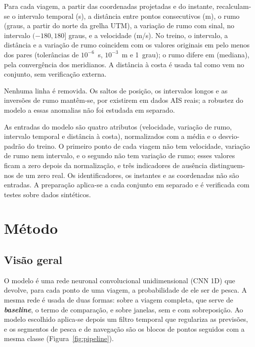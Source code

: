 \documentclass{article}
\begin{document}
Para cada viagem, a partir das coordenadas projetadas e do instante, recalculam-se o intervalo temporal (s), a distância entre pontos consecutivos (m), o rumo (graus, a partir do norte da grelha UTM), a variação de rumo com sinal, no intervalo $(-180,180]$ graus, e a velocidade (m/s). No treino, o intervalo, a distância e a variação de rumo coincidem com os valores originais em pelo menos \resPrepCoincide{} dos pares (tolerâncias de $10^{-6}$~s, $10^{-3}$~m e 1~grau); o rumo difere em \resPrepBearingMediana\textdegree{} (mediana), pela convergência dos meridianos. A distância à costa é usada tal como vem no conjunto, sem verificação externa.

Nenhuma linha é removida. Os saltos de posição, os intervalos longos e as inversões de rumo mantêm-se, por existirem em dados AIS reais; a robustez do modelo a essas anomalias não foi estudada em separado.

As entradas do modelo são quatro atributos (velocidade, variação de rumo, intervalo temporal e distância à costa), normalizados com a média e o desvio-padrão do treino. O primeiro ponto de cada viagem não tem velocidade, variação de rumo nem intervalo, e o segundo não tem variação de rumo; esses valores ficam a zero depois da normalização, e três indicadores de ausência distinguem-nos de um zero real. Os identificadores, os instantes e as coordenadas não são entradas. A preparação aplica-se a cada conjunto em separado e é verificada com testes sobre dados sintéticos.

\section{Método}
\label{sec:metodo}

\subsection{Visão geral}

O modelo é uma rede neuronal convolucional unidimensional (CNN 1D) que devolve, para cada ponto de uma viagem, a probabilidade de ele ser de pesca. A mesma rede é usada de duas formas: sobre a viagem completa, que serve de \textbf{\emph{baseline}}, o termo de comparação, e sobre janelas, sem e com sobreposição. Ao modelo escolhido aplica-se depois um filtro temporal que regulariza as previsões, e os segmentos de pesca e de navegação são os blocos de pontos seguidos com a mesma classe (Figura~\ref{fig:pipeline}).
\end{document}

